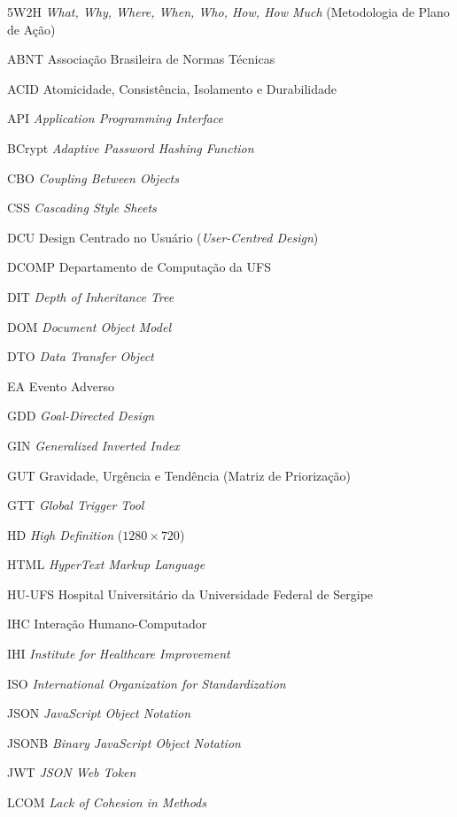 \begin{siglas}
    \item[5W2H] \textit{What, Why, Where, When, Who, How, How Much} (Metodologia de Plano de Ação)
    \item[ABNT] Associação Brasileira de Normas Técnicas
    \item[ACID] Atomicidade, Consistência, Isolamento e Durabilidade
    \item[API] \textit{Application Programming Interface}
    \item[BCrypt] \textit{Adaptive Password Hashing Function}
    \item[CBO] \textit{Coupling Between Objects}
    \item[CSS] \textit{Cascading Style Sheets}
    \item[DCU] Design Centrado no Usuário (\textit{User-Centred Design})
    \item[DCOMP] Departamento de Computação da UFS
    \item[DIT] \textit{Depth of Inheritance Tree}
    \item[DOM] \textit{Document Object Model}
    \item[DTO] \textit{Data Transfer Object}
    \item[EA] Evento Adverso
    \item[GDD] \textit{Goal-Directed Design}
    \item[GIN] \textit{Generalized Inverted Index}
    \item[GUT] Gravidade, Urgência e Tendência (Matriz de Priorização)
    \item[GTT] \textit{Global Trigger Tool}
    \item[HD] \textit{High Definition} ($1280 \times 720$)
    \item[HTML] \textit{HyperText Markup Language}
    \item[HU-UFS] Hospital Universitário da Universidade Federal de Sergipe
    \item[IHC] Interação Humano-Computador
    \item[IHI] \textit{Institute for Healthcare Improvement}
    \item[ISO] \textit{International Organization for Standardization}
    \item[JSON] \textit{JavaScript Object Notation}
    \item[JSONB] \textit{Binary JavaScript Object Notation}
    \item[JWT] \textit{JSON Web Token}
    \item[LCOM] \textit{Lack of Cohesion in Methods}

\end{siglas}
